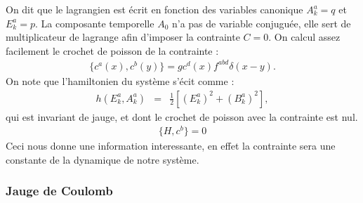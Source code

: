 \documentclass[a4paper,11pt]{article} %
\theoremstyle{plain}
\theoremstyle{definition}
\theoremstyle{remark}
\numberwithin{equation}{section}
\numberwithin{equation}{subsection}
\numberwithin{figure}{section}
\begin{document}
On dit que le lagrangien est écrit en fonction des variables canonique $A_{k}^{a}=q$ et $E_{k}^{a}=p$. La composante temporelle $A_{0}$ n'a pas de variable conjuguée, elle sert de multiplicateur de lagrange afin d'imposer la contrainte $C=0$. On calcul assez facilement le crochet de poisson de la contrainte :
\begin{eqnarray*}
 \{ c^{a}(x) , c^{b}(y) \} = g c^{d}(x) f^{abd} \delta(x-y).
\end{eqnarray*}
On note que l'hamiltonien du système s'écit comme :
\begin{eqnarray*}
 h(E_{k}^{a},A_{k}^{a}) &=& \frac{1}{2}\left[(E_{k}^{a})^{2} + (B_{k}^{a})^2 \right],
\end{eqnarray*}
qui est invariant de jauge, et dont le crochet de poisson avec la contrainte est nul.
\begin{eqnarray*}
 \{ H , c^{b} \} = 0 
\end{eqnarray*}
Ceci nous donne une information interessante, en effet la contrainte sera une constante de la dynamique de notre système.

    \subsubsection{Jauge de Coulomb}
\end{document}
